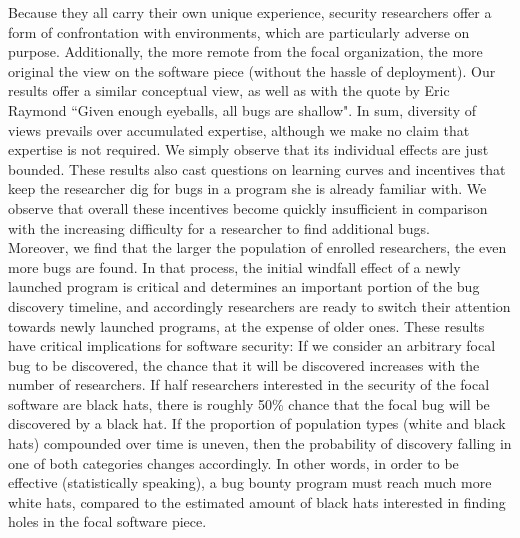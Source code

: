 Because they all carry their own unique experience, security researchers offer a form of confrontation with environments, which are particularly adverse on purpose. Additionally, the more remote from the focal organization, the more original the view on the software piece (without the hassle of deployment). Our results offer a similar conceptual view, as well as with the quote by Eric Raymond ``Given enough eyeballs, all bugs are shallow". In sum, diversity of views prevails over accumulated expertise, although we make no claim that expertise is not required. We simply observe that its individual effects are just bounded. These results also cast questions on learning curves and incentives that keep the researcher dig for bugs in a program she is already familiar with. We observe that overall these incentives become quickly insufficient in comparison with the increasing difficulty for a researcher to find additional bugs.\\

Moreover, we find that the larger the population of enrolled researchers, the even more bugs are found. In that process, the initial windfall effect of a newly launched program is critical and determines an important portion of the bug discovery timeline, and accordingly researchers are ready to switch their attention towards newly launched programs, at the expense of older ones. These results have critical implications for software security: If we consider an arbitrary focal bug to be discovered, the chance that it will be discovered increases with the number of researchers. If half researchers interested in the security of the focal software are black hats, there is roughly 50\% chance that the focal bug will be discovered by a black hat. If the proportion of population types (white and black hats) compounded over time is uneven, then the probability of discovery falling in one of both categories changes accordingly. In other words, in order to be effective (statistically speaking), a bug bounty program must reach much more white hats, compared to the estimated amount of black hats interested in finding holes in the focal software piece.\\

